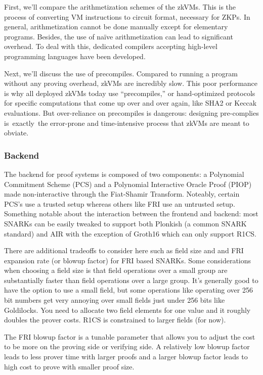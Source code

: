\documentclass{scrartcl}
\begin{document}
First, we'll compare the arithmetization schemes of the zkVMs. This is the process of converting VM instructions to circuit format, necessary for ZKPs. In general, arithmetization cannot be done manually except for elementary programs. Besides, the use of naïve arithmetization can lead to significant overhead. To deal with this, dedicated compilers accepting high-level programming languages have been developed.

Next, we'll discuss the use of precompiles. Compared to running a program without any proving overhead, zkVMs are incredibly slow. This poor performance is why all deployed zkVMs today use “precompiles,” or hand-optimized protocols for specific computations that come up over and over again, like SHA2 or Keccak evaluations. But over-reliance on precompiles is dangerous: designing pre-complies is exactly the error-prone and time-intensive process that zkVMs are meant to obviate.

\subsubsection{Backend}

The backend for proof systems is composed of two components: a Polynomial Commitment Scheme (PCS) and a Polynomial Interactive Oracle Proof (PIOP) made non-interactive through the Fiat-Shamir Transform. Noteably, certain PCS's use a trusted setup whereas others like FRI use an untrusted setup. Something notable about the interaction between the frontend and backend: most SNARKs can be easily tweaked to support both Plonkish (a common SNARK standard) and AIR with the exception of Groth16 which can only support R1CS.

There are additional tradeoffs to consider here such as field size and and FRI expansion rate (or blowup factor) for FRI based SNARKs. Some considerations when choosing a field size is that field operations over a small group are substantially faster than field operations over a large group. It’s generally good to have the option to use a small field, but some operations like operating over 256 bit numbers get very annoying over small fields just under 256 bits like Goldilocks. You need to allocate two field elements for one value and it roughly doubles the prover costs. R1CS is constrained to larger fields (for now).

The FRI blowup factor is a tunable parameter that allows you to adjust the cost to be more on the proving side or verifying side. A relatively low blowup factor leads to less prover time with larger proofs and a larger blowup factor leads to high cost to prove with smaller proof size.
\end{document}
